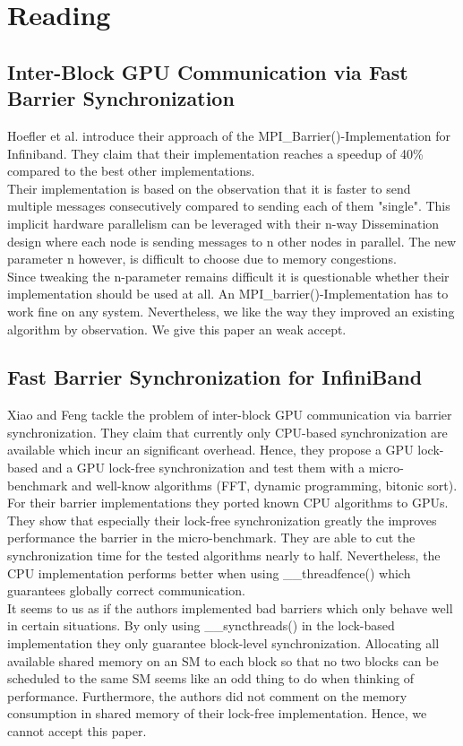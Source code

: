 \documentclass{article}
\newcommand{\enterProblemHeader}[1]{
}
\newcommand{\exitProblemHeader}[1]{
}
\newcounter{homeworkProblemCounter} %
\newcommand{\homeworkProblemName}{}
\newenvironment{homeworkProblem}[1][Problem \arabic{homeworkProblemCounter}]{ %
\stepcounter{homeworkProblemCounter} %
\renewcommand{\homeworkProblemName}{#1} %
\section{\homeworkProblemName} %
}{
}
\begin{document}
\begin{homeworkProblem}[Reading]
\subsection{Inter-Block GPU Communication via Fast Barrier Synchronization}
Hoefler et al. introduce their approach of the MPI\_Barrier()-Implementation for Infiniband.
They claim that their implementation reaches a speedup of 40\% compared to the best other 
implementations. \\
Their implementation is based on the observation that it is faster to send multiple 
messages consecutively compared to sending each of them "single". This implicit hardware 
parallelism can be leveraged with their n-way Dissemination design where each node is 
sending messages to n other nodes in parallel. The new parameter n however, is difficult 
to choose due to memory congestions.\\
Since tweaking the n-parameter remains difficult it is questionable whether their 
implementation should be used at all. An MPI\_barrier()-Implementation has to work fine on 
any system. Nevertheless, we like the way they improved an existing algorithm by 
observation. We give this paper an weak accept.


\subsection{Fast Barrier Synchronization for InfiniBand}
Xiao and Feng tackle the problem of inter-block GPU communication via barrier
synchronization. They claim that currently only CPU-based synchronization are available 
which incur an significant overhead. Hence, they propose a GPU lock-based and a GPU 
lock-free synchronization and test them with a micro-benchmark and well-know algorithms 
(FFT, dynamic programming, bitonic sort). \\
For their barrier implementations they ported known CPU algorithms to GPUs. They show 
that especially their lock-free synchronization greatly the improves performance the 
barrier in the micro-benchmark. They are able to cut the synchronization time for the 
tested algorithms nearly to half. Nevertheless, the CPU implementation performs better 
when using \_\_threadfence() which guarantees globally correct communication. \\
It seems to us as if the authors implemented bad barriers which only behave well in 
certain situations. By only using \_\_syncthreads() in the lock-based implementation they 
only guarantee block-level synchronization. Allocating all available shared memory on an 
SM to each block so that no two blocks can be scheduled to the same SM seems like an odd 
thing to do when thinking of performance. Furthermore, the authors did not comment on the
memory consumption in shared memory of their lock-free implementation. Hence, we cannot 
accept this paper.
\end{homeworkProblem}
\end{document}
